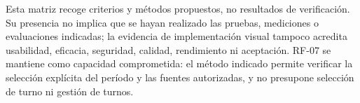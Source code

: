 Esta matriz recoge criterios y métodos propuestos, no resultados de verificación. Su presencia no implica que se hayan realizado las pruebas, mediciones o evaluaciones indicadas; la evidencia de implementación visual tampoco acredita usabilidad, eficacia, seguridad, calidad, rendimiento ni aceptación. RF-07 se mantiene como capacidad comprometida: el método indicado permite verificar la selección explícita del período y las fuentes autorizadas, y no presupone selección de turno ni gestión de turnos.
